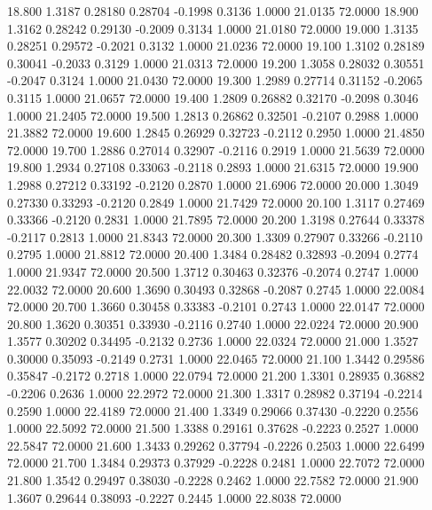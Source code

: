  18.800   1.3187   0.28180   0.28704  -0.1998   0.3136   1.0000  21.0135  72.0000
  18.900   1.3162   0.28242   0.29130  -0.2009   0.3134   1.0000  21.0180  72.0000
  19.000   1.3135   0.28251   0.29572  -0.2021   0.3132   1.0000  21.0236  72.0000
  19.100   1.3102   0.28189   0.30041  -0.2033   0.3129   1.0000  21.0313  72.0000
  19.200   1.3058   0.28032   0.30551  -0.2047   0.3124   1.0000  21.0430  72.0000
  19.300   1.2989   0.27714   0.31152  -0.2065   0.3115   1.0000  21.0657  72.0000
  19.400   1.2809   0.26882   0.32170  -0.2098   0.3046   1.0000  21.2405  72.0000
  19.500   1.2813   0.26862   0.32501  -0.2107   0.2988   1.0000  21.3882  72.0000
  19.600   1.2845   0.26929   0.32723  -0.2112   0.2950   1.0000  21.4850  72.0000
  19.700   1.2886   0.27014   0.32907  -0.2116   0.2919   1.0000  21.5639  72.0000
  19.800   1.2934   0.27108   0.33063  -0.2118   0.2893   1.0000  21.6315  72.0000
  19.900   1.2988   0.27212   0.33192  -0.2120   0.2870   1.0000  21.6906  72.0000
  20.000   1.3049   0.27330   0.33293  -0.2120   0.2849   1.0000  21.7429  72.0000
  20.100   1.3117   0.27469   0.33366  -0.2120   0.2831   1.0000  21.7895  72.0000
  20.200   1.3198   0.27644   0.33378  -0.2117   0.2813   1.0000  21.8343  72.0000
  20.300   1.3309   0.27907   0.33266  -0.2110   0.2795   1.0000  21.8812  72.0000
  20.400   1.3484   0.28482   0.32893  -0.2094   0.2774   1.0000  21.9347  72.0000
  20.500   1.3712   0.30463   0.32376  -0.2074   0.2747   1.0000  22.0032  72.0000
  20.600   1.3690   0.30493   0.32868  -0.2087   0.2745   1.0000  22.0084  72.0000
  20.700   1.3660   0.30458   0.33383  -0.2101   0.2743   1.0000  22.0147  72.0000
  20.800   1.3620   0.30351   0.33930  -0.2116   0.2740   1.0000  22.0224  72.0000
  20.900   1.3577   0.30202   0.34495  -0.2132   0.2736   1.0000  22.0324  72.0000
  21.000   1.3527   0.30000   0.35093  -0.2149   0.2731   1.0000  22.0465  72.0000
  21.100   1.3442   0.29586   0.35847  -0.2172   0.2718   1.0000  22.0794  72.0000
  21.200   1.3301   0.28935   0.36882  -0.2206   0.2636   1.0000  22.2972  72.0000
  21.300   1.3317   0.28982   0.37194  -0.2214   0.2590   1.0000  22.4189  72.0000
  21.400   1.3349   0.29066   0.37430  -0.2220   0.2556   1.0000  22.5092  72.0000
  21.500   1.3388   0.29161   0.37628  -0.2223   0.2527   1.0000  22.5847  72.0000
  21.600   1.3433   0.29262   0.37794  -0.2226   0.2503   1.0000  22.6499  72.0000
  21.700   1.3484   0.29373   0.37929  -0.2228   0.2481   1.0000  22.7072  72.0000
  21.800   1.3542   0.29497   0.38030  -0.2228   0.2462   1.0000  22.7582  72.0000
  21.900   1.3607   0.29644   0.38093  -0.2227   0.2445   1.0000  22.8038  72.0000
